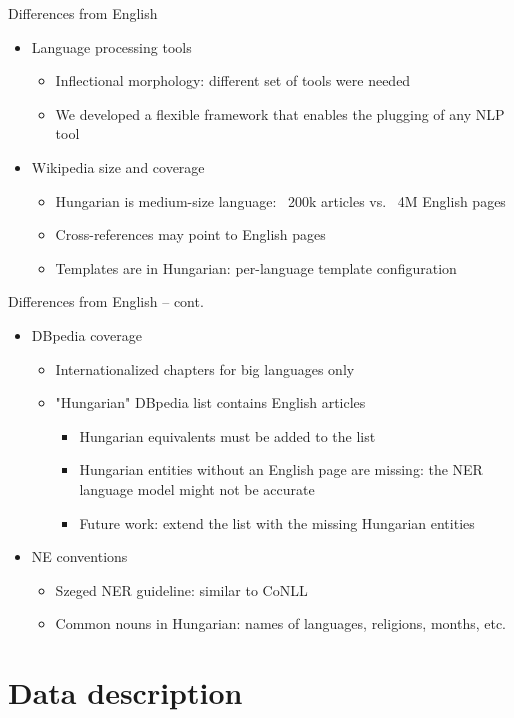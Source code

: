 \documentclass[utf8x]{beamer}
\newcommand{\vitem}{\vfill \item}
\begin{document}
\begin{frame}{Differences from English}
  \begin{itemize}
  \vitem Language processing tools
    \begin{itemize}
    \vitem Inflectional morphology: different set of tools were needed 
    \vitem We developed a flexible framework that enables the plugging of any NLP tool
    \end{itemize}
  \vitem Wikipedia size and coverage
    \begin{itemize}
    \vitem Hungarian is medium-size language: ~200k articles vs. ~4M English pages
    \vitem Cross-references may point to English pages
    \vitem Templates are in Hungarian: per-language template configuration
    \end{itemize}
  \end{itemize}
\end{frame}

\begin{frame}{Differences from English -- cont.}
  \begin{itemize}
  \vitem DBpedia coverage
    \begin{itemize}
    \vitem Internationalized chapters for big languages only
    \vitem "Hungarian" DBpedia list contains English articles %
      \begin{itemize}
      \vitem Hungarian equivalents must be added to the list %
      \vitem Hungarian entities without an English page are missing:
             the NER language model might not be accurate
      \vitem Future work: extend the list with the missing Hungarian entities
      \end{itemize}
    \end{itemize}
  \vitem NE conventions
    \begin{itemize}
    \vitem Szeged NER guideline: similar to CoNLL
    \vitem Common nouns in Hungarian: names of languages, religions, months, etc.
    \end{itemize}
  \end{itemize}
\end{frame}

\section{Data description}
\end{document}
